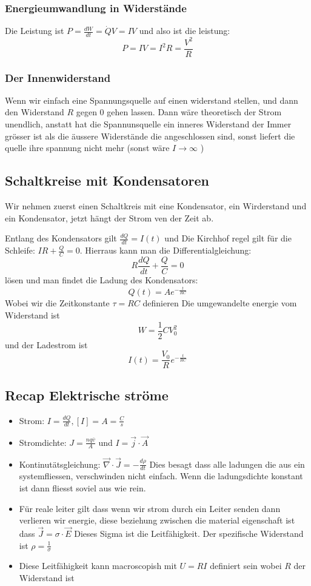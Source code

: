 \documentclass{article}
\begin{document}
\subsubsection{Energieumwandlung in Widerstände}
Die Leistung ist $P=\frac{dW}{dt}=\dot{Q}V=IV$ und also ist die leistung:\[P=IV=I^2R=\frac{V^2}{R}\]
\subsubsection{Der Innenwiderstand}
Wenn wir einfach eine Spannungsquelle auf einen widerstand stellen, und dann den Widerstand $R$ gegen $0$ gehen lassen. Dann wäre theoretisch der Strom unendlich, anstatt hat die Spannunsquelle ein inneres Widerstand der Immer grösser ist als die äussere Widerstände die angeschlossen sind, sonst liefert die quelle ihre spannung nicht mehr (sonst wäre $I\rightarrow \infty$ )
\subsection{Schaltkreise mit Kondensatoren}
\begin{multicols}{2}
Wir nehmen zuerst einen Schaltkreis mit eine Kondensator, ein Wirderstand und ein Kondensator, jetzt hängt der Strom ven der Zeit ab.\vfill\null\columnbreak
\begin{center}
\end{center}
\end{multicols}
Entlang des Kondensators gilt $\frac{dQ}{dt}=I(t)$ und Die Kirchhof regel gilt für die Schleife: $IR+\frac{Q}{C}=0$. Hierraus kann man die Differentialgleichung:
\[R\frac{dQ}{dt}+\frac{Q}{C}=0\] lösen und man findet die Ladung des Kondensators:
\[Q(t)=Ae^{-\frac{t}{RC}}\] Wobei wir die Zeitkonstante $\tau=RC$ definieren
Die umgewandelte energie vom Widerstand ist \[W=\frac{1}{2}CV_0^2\] und der Ladestrom ist \[I(t)=\frac{V_0}{R}e^{-\frac{t}{RC}}\]
\subsection{Recap Elektrische ströme}
\begin{itemize}
  \item{Strom: $I=\frac{dQ}{dt}, [I]=A=\frac{C}{s}$}
  \item{Stromdichte: $J=\frac{nq\overline{v}}{A}$ und $I=\vec{j}\cdot\vec{A}$}
  \item{Kontinutätsgleichung: $\vec{\nabla}\cdot\vec{J}=-\frac{d\rho}{dt}$ Dies besagt dass alle ladungen die aus ein 
    systemfliessen, verschwinden nicht einfach. Wenn die ladungsdichte konstant ist dann fliesst soviel aus wie rein.}
  \item{Für reale leiter gilt dass wenn wir strom durch ein Leiter senden dann verlieren wir energie, diese beziehung
    zwischen die material eigenschaft ist dass $\vec{J}=\sigma\cdot\vec{E}$ Dieses Sigma ist die Leitfähigkeit. Der spezifische Widerstand ist $\rho=\frac{1}{\sigma}$}
  \item{Diese Leitfähigkeit kann macroscopish mit $U=RI$ definiert sein wobei $R$ der Widerstand ist}
\end{itemize}
\end{document}
